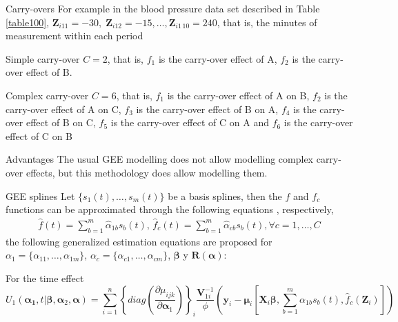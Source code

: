 \documentclass[t,9pt]{beamer}
\begin{document}
\begin{frame}[fragile]{Carry-overs}
For example in the blood pressure data set described in Table \ref{table100},  $\pmb{Z}_{i11}=-30, \; \pmb{Z}_{i12}=-15, \ldots, \pmb{Z}_{i1\,10}=240$, that is, the minutes of measurement within each period
\begin{block}{Simple carry-over}
     $C=2$, that is, $f_1$  is the carry-over effect of A, $f_2$  is the carry-over effect of B. 
\end{block}
\begin{block}{Complex carry-over}
     $C=6$, that is, $f_1$  is the carry-over effect of A on B, $f_2$  is the carry-over effect of A on C,  $f_3$ is the carry-over effect of B on A,  $f_4$ is the carry-over effect of B on C,  $f_5$ is the carry-over effect of C on A and  $f_6$ is the carry-over effect of C on B
\end{block}
\begin{block}{Advantages}
The usual GEE modelling does not allow modelling complex carry-over effects, but this methodology does allow modelling them.
\end{block}
\end{frame}
\begin{frame}[fragile]{GEE splines}
Let $\{s_1(t), \ldots, s_{m}(t)\}$ be a basis splines, then  the  $f$ and $f_c$ functions can be approximated through the following equations \citep{yu2012spline}, respectively,
\begin{align*}
    \hat{f}(t)= \sum_{b=1}^m \hat{\alpha}_{1b}s_b(t),  \,
    \hat{f}_c(t)= \sum_{b=1}^m \hat{\alpha}_{cb}s_b(t), \forall c=1, \ldots,C
\end{align*}
the following generalized estimation equations are proposed for $\alpha_{1}=\{\alpha_{11},\ldots, \alpha_{1m}\}$, $ \alpha_c=\{\alpha_{c1},\ldots, \alpha_{cm}\}$,  $\pmb{\beta}$ y $\pmb{R}(\pmb{\alpha})$:
\begin{block}{For the time effect}
\scriptsize
     \begin{equation}\nonumber
        U_1(\pmb{\alpha_1}, t|\pmb{\beta}, \pmb{\alpha}_2, \pmb{\alpha})=\sum_{i=1}^n \left\{ diag\left(\frac{\partial \mu_{ijk}}{\partial \pmb{\alpha}_1}\right)\right\}_i \frac {\pmb{V}^{-1}_{1i}}{\phi} \left(\pmb{y}_i-\pmb{\mu}_i\left[\pmb{X}_i \pmb{\beta},\sum_{b=1}^m \alpha_{1b}s_b(t)  ,\hat{f}_c(\pmb{Z}_{i}) \right]\right) 
     \end{equation}
 \end{block}
\end{frame}
\end{document}
